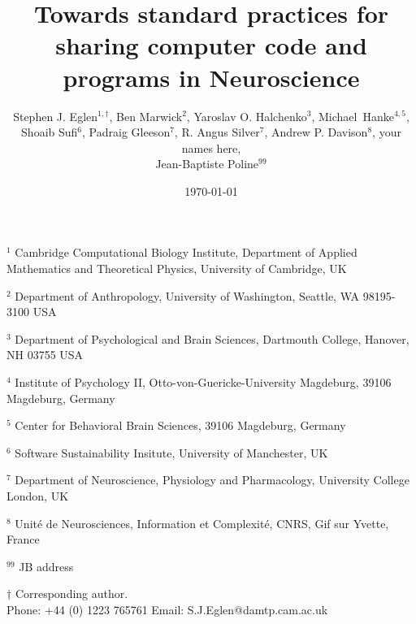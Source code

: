 \documentclass[11pt]{article}
\begin{document}
\doublespacing

\title{Towards standard practices for sharing computer code and programs in Neuroscience}

\author{Stephen J. Eglen$^{1,\dagger}$, Ben Marwick${^2}$, Yaroslav
  O. Halchenko${^3}$, Michael~Hanke${^{4,5}}$,
  \\
  Shoaib Sufi$^6$,
  Padraig Gleeson$^7$, R. Angus Silver$^7$,
  Andrew P. Davison$^8$,
  your names here,\\
  Jean-Baptiste Poline$^{99}$}
\date{\today}
\maketitle

\noindent $^{1}$ 
Cambridge Computational Biology Institute,
Department of Applied Mathematics and Theoretical Physics,
University of Cambridge, UK
\vspace*{2mm}

\noindent $^{2}$ 
Department of Anthropology,
University of Washington,
Seattle, WA 98195-3100 USA 
\vspace*{2mm}

\noindent $^{3}$
Department of Psychological and Brain Sciences,
Dartmouth College,
Hanover, NH 03755 USA
\vspace*{2mm}

\noindent $^{4}$
Institute of Psychology II, Otto-von-Guericke-University Magdeburg, 39106 Magdeburg, Germany
\vspace*{2mm}

\noindent $^{5}$
Center for Behavioral Brain Sciences, 39106 Magdeburg, Germany
\vspace*{2mm}

\noindent $^{6}$
Software Sustainability Insitute, University of Manchester, UK
\vspace*{2mm}

\noindent $^{7}$
Department of Neuroscience, Physiology and Pharmacology, University College London, UK
\vspace*{2mm}

\noindent $^{8}$
Unit\'{e} de Neurosciences, Information et Complexit\'{e}, CNRS, Gif sur Yvette, France
\vspace*{2mm}

\noindent $^{99}$ JB address

\vspace*{2mm}


\noindent $\dagger$
Corresponding author.\\
\noindent Phone: +44 (0) 1223 765761
\noindent Email: S.J.Eglen@damtp.cam.ac.uk
\end{document}
